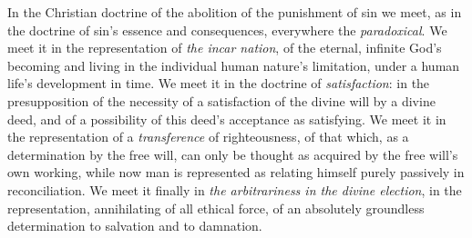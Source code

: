 \documentclass[12pt,a4paper]{book}
\begin{document}
In the Christian doctrine of the abolition of the punishment of sin we meet, as
in the doctrine of sin's essence and consequences, everywhere the
\emph{paradoxical}. We meet it in the representation of \emph{the incar\-%
nation}, of the eternal, infinite God's becoming and living in the individual
human nature's limitation, under a human life's development in time. We meet it
in the doctrine of \emph{satisfaction}: in the presupposition of the necessity
of a satisfaction of the divine will by a divine deed, and of a possibility of
this deed's acceptance as satisfying. We meet it in the representation of a
\emph{transference} of righteousness, of that which, as a determination by the
free will, can only be thought as acquired by the free will's own working, while
now man is represented as relating himself purely passively in reconciliation.
We meet it finally in \emph{the arbitrariness in the divine election}, in the
representation, annihilating of all ethical force, of an absolutely groundless
determination to salvation and to damnation.
\end{document}
